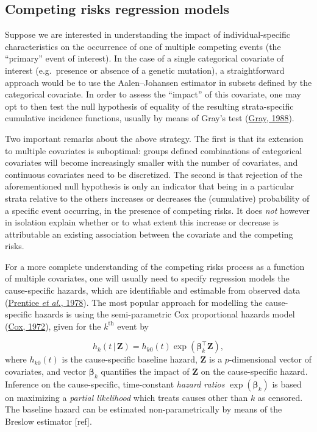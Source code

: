 \documentclass[
  letterpaper,
  DIV=11,
  numbers=noendperiod]{scrreprt}
\newcommand{\given}{\,|\,}
\begin{document}
\hypertarget{competing-risks-regression-models}{%
\subsection{Competing risks regression
models}\label{competing-risks-regression-models}}

Suppose we are interested in understanding the impact of
individual-specific characteristics on the occurrence of one of multiple
competing events (the ``primary'' event of interest). In the case of a
single categorical covariate of interest (e.g.~presence or absence of a
genetic mutation), a straightforward approach would be to use the
Aalen--Johansen estimator in subsets defined by the categorical
covariate. In order to assess the ``impact'' of this covariate, one may
opt to then test the null hypothesis of equality of the resulting
strata-specific cumulative incidence functions, usually by means of
Gray's test (\protect\hyperlink{ref-grayClassKSampleTests1988}{Gray,
1988}).

Two important remarks about the above strategy. The first is that its
extension to multiple covariates is suboptimal: groups defined
combinations of categorical covariates will become increasingly smaller
with the number of covariates, and continuous covariates need to be
discretized. The second is that rejection of the aforementioned null
hypothesis is only an indicator that being in a particular strata
relative to the others increases or decreases the (cumulative)
probability of a specific event occurring, in the presence of competing
risks. It does \emph{not} however in isolation explain whether or to
what extent this increase or decrease is attributable an existing
association between the covariate and the competing risks.

For a more complete understanding of the competing risks process as a
function of multiple covariates, one will usually need to specify
regression models the cause-specific hazards, which are identifiable and
estimable from observed data
(\protect\hyperlink{ref-prenticeAnalysisFailureTimes1978}{Prentice
\emph{et al.}, 1978}). The most popular approach for modelling the
cause-specific hazards is using the semi-parametric Cox proportional
hazards model
(\protect\hyperlink{ref-coxRegressionModelsLifeTables1972}{Cox, 1972}),
given for the \(k^{\text{th}}\) event by

\[
h_k(t \given \mathbf{Z}) = h_{k0}(t)\exp(\boldsymbol{\beta}_k^\intercal \mathbf{Z}),
\] where \(h_{k0}(t)\) is the cause-specific baseline hazard,
\(\mathbf{Z}\) is a \(p\)-dimensional vector of covariates, and vector
\(\boldsymbol{\beta}_k\) quantifies the impact of \(\mathbf{Z}\) on the
cause-specific hazard. Inference on the cause-specific, time-constant
\emph{hazard ratios} \(\exp(\boldsymbol{\beta}_k)\) is based on
maximizing a \emph{partial likelihood} which treats causes other than
\(k\) as censored. The baseline hazard can be estimated
non-parametrically by means of the Breslow estimator {[}ref{]}.
\end{document}

